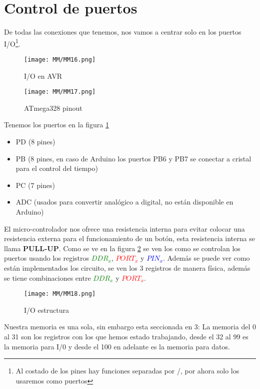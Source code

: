 \documentclass[
	12pt, %
	fleqn, %
	a4paper, %
]{LegrandOrangeBook}
\begin{document}
\section{Control de puertos}\label{Control de puertos}
De todas las conexiones que tenemos, nos vamos a centrar solo en los puertos I/O\footnote{Al costado de los pines hay funciones separadas por /, por ahora solo los usaremos como puertos}.
\begin{figure}[H]
\centering
\texttt{[image: MM/MM16.png]}
\caption{I/O en AVR}
\end{figure}
\begin{figure}[]
\centering
\texttt{[image: MM/MM17.png]}
\caption{ATmega328 pinout}
\label{fig:ATmega328 pinout}
\end{figure}
Tenemos los puertos en la figura \ref{fig:ATmega328 pinout}
\begin{itemize}
\item PD (8 pines)
\item PB (8 pines, en caso de Arduino los puertos PB6 y PB7 se conectar a cristal para el control del tiempo)
\item PC (7 pines)
\item ADC (usados para convertir analógico a digital, no están disponible en Arduino)
\end{itemize}
El micro-controlador nos ofrece una resistencia interna para evitar colocar una resistencia externa para el funcionamiento de un botón, esta resistencia interna se llama \textbf{PULL-UP}. Como se ve en la figura \ref{fig:I/O estructura} se ven los como se controlan los puertos usando los registros \textcolor{green}{$DDR_x$}, \textcolor{red}{$PORT_x$} y \textcolor{blue}{$PIN_x$}. Además se puede ver como están implementados los circuito, se ven los 3 registros de manera física, además se tiene combinaciones entre \textcolor{green}{$DDR_x$} y \textcolor{red}{$PORT_x$}.
\begin{figure}[H]
\centering
\texttt{[image: MM/MM18.png]}
\caption{I/O estructura}
\label{fig:I/O estructura}
\end{figure}
\begin{remark}
Nuestra memoria es una sola, sin embargo esta seccionada en 3: La memoria del 0 al 31 son los registros con los que hemos estado trabajando, desde el 32 al 99 es la memoria para I/0 y desde el 100 en adelante es la memoria para datos.
\end{remark}
\end{document}
